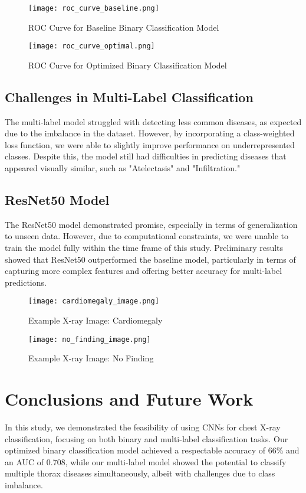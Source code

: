 \documentclass[conference]{IEEEtran}
\begin{document}
\begin{figure}[H]
    \centering
    \texttt{[image: roc\_curve\_baseline.png]} %
    \caption{ROC Curve for Baseline Binary Classification Model}
    \label{fig:roc_baseline}
\end{figure}

\begin{figure}[H]
    \centering
    \texttt{[image: roc\_curve\_optimal.png]} %
    \caption{ROC Curve for Optimized Binary Classification Model}
    \label{fig:roc_optimal}
\end{figure}


\subsection{Challenges in Multi-Label Classification}
The multi-label model struggled with detecting less common diseases, as expected due to the imbalance in the dataset. However, by incorporating a class-weighted loss function, we were able to slightly improve performance on underrepresented classes. Despite this, the model still had difficulties in predicting diseases that appeared visually similar, such as "Atelectasis" and "Infiltration."

\subsection{ResNet50 Model}
The ResNet50 model demonstrated promise, especially in terms of generalization to unseen data. However, due to computational constraints, we were unable to train the model fully within the time frame of this study. Preliminary results showed that ResNet50 outperformed the baseline model, particularly in terms of capturing more complex features and offering better accuracy for multi-label predictions.

\begin{figure}[H]
    \centering
    \texttt{[image: cardiomegaly\_image.png]}
    \caption{Example X-ray Image: Cardiomegaly}
    \label{fig:cardiomegaly}
\end{figure}

\begin{figure}[H]
    \centering
    \texttt{[image: no\_finding\_image.png]}
    \caption{Example X-ray Image: No Finding}
    \label{fig:no_finding}
\end{figure}

\section{Conclusions and Future Work}
In this study, we demonstrated the feasibility of using CNNs for chest X-ray classification, focusing on both binary and multi-label classification tasks. Our optimized binary classification model achieved a respectable accuracy of 66\% and an AUC of 0.708, while our multi-label model showed the potential to classify multiple thorax diseases simultaneously, albeit with challenges due to class imbalance.
\end{document}
